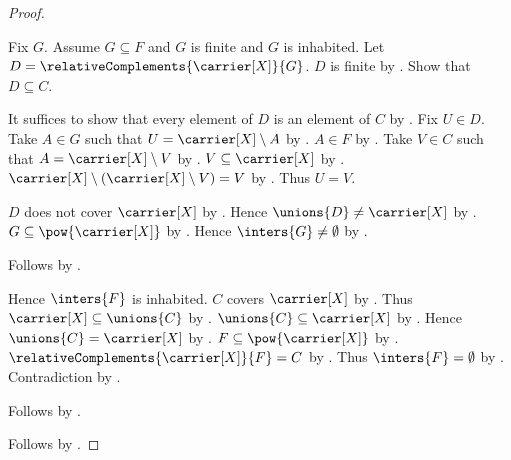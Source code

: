 \begin{proof}
\begin{subproof}
\begin{subproof}
\begin{byCase}
\begin{subproof}
\begin{subproof}
                        Fix $G$.
                        Assume $G\subseteq F$ and $G$ is finite and
                            $G$ is inhabited.
                        Let $D=\relativeComplements{\carrier[X]}{G}$.
                        $D$ is finite
                            by .
                        Show that $D\subseteq C$.
                        \begin{subproof}
                            It suffices to show that every element of $D$ is
                                an element of $C$ by .
                            Fix $U\in D$.
                            Take $A\in G$ such that
                                $U=\carrier[X]\setminus A$
                                by .
                            $A\in F$ by .
                            Take $V\in C$ such that
                                $A=\carrier[X]\setminus V$
                                by .
                            $V\subseteq\carrier[X]$
                                by .
                            $\carrier[X]\setminus(\carrier[X]\setminus V)=V$
                                by .
                            Thus $U=V$.
                        \end{subproof}
                        $D$ does not cover $\carrier[X]$ by \auto.
                        Hence $\unions{D}\neq\carrier[X]$
                            by .
                        $G\subseteq\pow{\carrier[X]}$
                            by .
                        Hence $\inters{G}\neq\emptyset$
                            by .
                    \end{subproof}
                    Follows by .
                \end{subproof}
                Hence $\inters{F}$ is inhabited.
                $C$ covers $\carrier[X]$ by .
                Thus $\carrier[X]\subseteq\unions{C}$
                    by .
                $\unions{C}\subseteq\carrier[X]$
                    by .
                Hence $\unions{C}=\carrier[X]$
                    by .
                $F\subseteq\pow{\carrier[X]}$
                    by .
                $\relativeComplements{\carrier[X]}{F}=C$
                    by .
                Thus $\inters{F}=\emptyset$
                    by .
                Contradiction by .
            \end{byCase}
        \end{subproof}
        Follows by .
    \end{subproof}
    Follows by \auto.
\end{proof}

